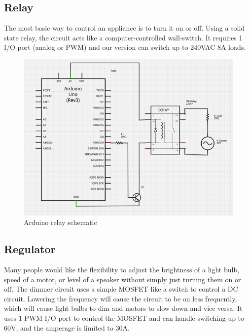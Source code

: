 \documentclass{chi-ext}
\begin{document}
\subsection{Relay}
The most basic way to control an appliance is to turn it on or off.
Using a solid state relay, the circuit acts like a computer-controlled wall-switch.
It requires 1 I/O port (analog or PWM) and our version can switch up to 240VAC 8A loads. \cite{_control}

\begin{figure}
  \begin{center}
  \includegraphics[width=\linewidth]{schematic.png}
  \caption{Arduino relay schematic}
  \label{fig:relay}
  \end{center}  
\end{figure}

\subsection{Regulator}
Many people would like the flexibility to adjust the brightness of a light bulb, speed of a motor, or level of a speaker without simply just turning them on or off.
The dimmer circuit uses a simple MOSFET like a switch to control a DC circuit.
Lowering the frequency will cause the circuit to be on less frequently, which will cause light bulbs to dim and motors to slow down and vice versa. 
It uses 1 PWM I/O port to control the MOSFET and can handle switching up to 60V, and the amperage is limited to 30A. \cite{_bildr}
\end{document}
